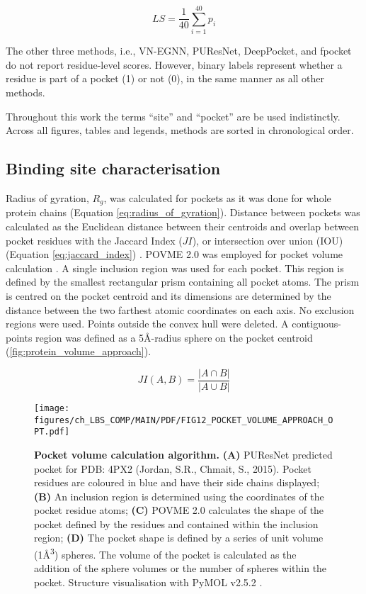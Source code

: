 \begin{equation}
LS = \frac{1}{40} \sum_{i=1}^{40} p_i
\label{eq:IFSP_score}
\end{equation}

The other three methods, i.e., VN-EGNN, PUResNet, DeepPocket, and fpocket do not report residue-level scores. However, binary labels represent whether a residue is part of a pocket (1) or not (0), in the same manner as all other methods.

Throughout this work the terms ``site'' and ``pocket'' are be used indistinctly. Across all figures, tables and legends, methods are sorted in chronological order.

\subsection{Binding site characterisation}

Radius of gyration, $R_{g}$, was calculated for pockets as it was done for whole protein chains (Equation \ref{eq:radius_of_gyration}). Distance between pockets was calculated as the Euclidean distance between their centroids and overlap between pocket residues with the Jaccard Index ($JI$), or intersection over union (IOU) (Equation \ref{eq:jaccard_index}) \cite{JACCARD_1901_INDEX, JACCARD_1912_INDEX}. POVME 2.0 was employed for pocket volume calculation \cite{DURRANT_2011_POVME, DURRANT_2014_POVME2, WAGNER_2017_POVME3}. A single inclusion region was used for each pocket. This region is defined by the smallest rectangular prism containing all pocket atoms. The prism is centred on the pocket centroid and its dimensions are determined by the distance between the two farthest atomic coordinates on each axis. No exclusion regions were used. Points outside the convex hull were deleted. A contiguous-points region was defined as a 5\AA{}-radius sphere on the pocket centroid (\autoref{fig:protein_volume_approach}).

\begin{equation}
JI(A, B) = \frac{|A \cap B|}{|A \cup B|}
\label{eq:jaccard_index}
\end{equation}

\begin{figure}[h]
    \centering
    \texttt{[image: figures/ch\_LBS\_COMP/MAIN/PDF/FIG12\_POCKET\_VOLUME\_APPROACH\_OPT.pdf]}
    \caption[Pocket volume calculation algorithm]{\textbf{Pocket volume calculation algorithm.} \textbf{(A)} PUResNet predicted pocket for PDB: 4PX2 (Jordan, S.R., Chmait, S., 2015). Pocket residues are coloured in blue and have their side chains displayed; \textbf{(B)} An inclusion region is determined using the coordinates of the pocket residue atoms; \textbf{(C)} POVME 2.0 calculates the shape of the pocket defined by the residues and contained within the inclusion region; \textbf{(D)} The pocket shape is defined by a series of unit volume (1\AA{}\textsuperscript{3}) spheres. The volume of the pocket is calculated as the addition of the sphere volumes or the number of spheres within the pocket. Structure visualisation with PyMOL v2.5.2 \cite{SCHRODINGER_2015_PYMOL}.}
    \label{fig:protein_volume_approach}
\end{figure}

